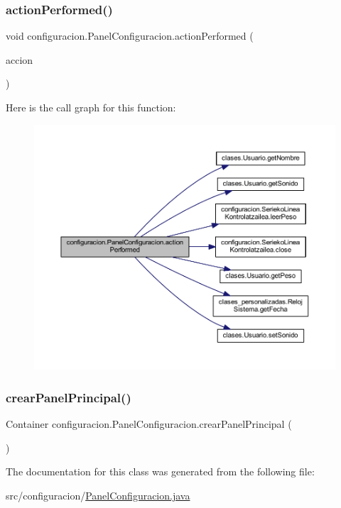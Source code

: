 \subsubsection{\texorpdfstring{action\+Performed()}{actionPerformed()}}
{\footnotesize\ttfamily void configuracion.\+Panel\+Configuracion.\+action\+Performed (\begin{DoxyParamCaption}\item[{Action\+Event}]{accion }\end{DoxyParamCaption})}

Here is the call graph for this function\+:
\nopagebreak
\begin{figure}[H]
\begin{center}
\leavevmode
\includegraphics[width=350pt]{classconfiguracion_1_1_panel_configuracion_aab9836cc65c7cf02ca7468f194c85e65_cgraph}
\end{center}
\end{figure}
\mbox{\label{classconfiguracion_1_1_panel_configuracion_a9eac30093e153865aad39f852a23ac37}} 
\subsubsection{\texorpdfstring{crear\+Panel\+Principal()}{crearPanelPrincipal()}}
{\footnotesize\ttfamily Container configuracion.\+Panel\+Configuracion.\+crear\+Panel\+Principal (\begin{DoxyParamCaption}{ }\end{DoxyParamCaption})}



The documentation for this class was generated from the following file\+:\begin{DoxyCompactItemize}
\item 
src/configuracion/\mbox{\hyperlink{_panel_configuracion_8java}{Panel\+Configuracion.\+java}}\end{DoxyCompactItemize}

